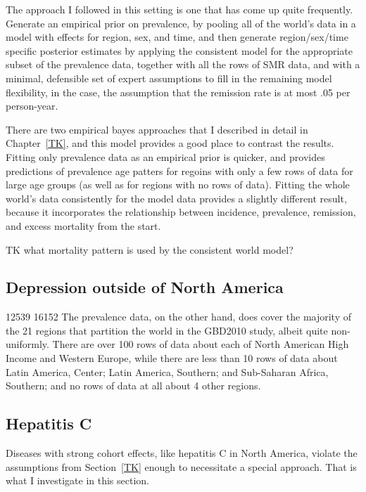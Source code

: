 The approach I followed in this setting is one that has come up quite
frequently.  Generate an empirical prior on prevalence, by pooling all
of the world's data in a model with effects for region, sex, and
time, and then generate region/sex/time specific posterior estimates
by applying the consistent model for the appropriate subset of the
prevalence data, together with all the rows of SMR data, and with a
minimal, defensible set of expert assumptions to fill in the remaining
model flexibility, in the case, the assumption that the remission rate
is at most .05 per person-year.

There are two empirical bayes approaches that I described in detail in
Chapter~\ref{TK}, and this model provides a good place to contrast the
results.  Fitting only prevalence data as an empirical prior is
quicker, and provides predictions of prevalence age patters for
regoins with only a few rows of data for large age groups (as well as
for regions with no rows of data).  Fitting the whole world's data
consistently for the model data provides a slightly different result,
because it incorporates the relationship between incidence,
prevalence, remission, and excess mortality from the start.

TK what mortality pattern is used by the consistent world model?

\subsection{Depression outside of North America}
12539 
16152
 The prevalence data, on the
other hand, does cover the majority of the 21 regions that partition
the world in the GBD2010 study, albeit quite non-uniformly.  There are
over 100 rows of data about each of North American High Income and
Western Europe, while there are less than 10 rows of data about Latin
America, Center; Latin America, Southern; and Sub-Saharan Africa,
Southern; and no rows of data at all about 4 other regions.

\subsection{Hepatitis C}
Diseases with strong cohort effects, like hepatitis C in North America,
violate the assumptions from Section~\ref{TK} enough to
necessitate a special approach.  That is what I investigate in this
section.

